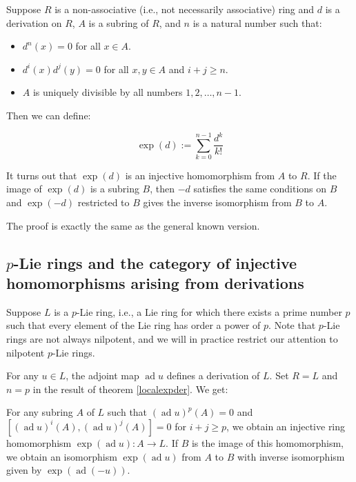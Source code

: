 \documentclass[10pt]{amsart}
\newcommand{\ad}{\operatorname{ad}}
\begin{document}
\begin{theorem}\label{localexpder}
Suppose $R$ is a non-associative (i.e., not necessarily associative)
ring and $d$ is a derivation on $R$, $A$ is a subring of $R$, and $n$
is a natural number such that:

\begin{itemize}
\item $d^n(x) = 0$ for all $x \in A$.
\item $d^i(x)d^j(y) = 0$ for all $x,y \in A$ and $i + j \ge n$.
\item $A$ is uniquely divisible by all numbers $1,2,\dots,n-1$.
\end{itemize}

Then we can define:

$$\exp(d) := \sum_{k=0}^{n-1} \frac{d^k}{k!}$$

It turns out that $\exp(d)$ is an injective homomorphism from $A$ to
$R$. If the image of $\exp(d)$ is a subring $B$, then $-d$ satisfies
the same conditions on $B$ and $\exp(-d)$ restricted to $B$ gives the
inverse isomorphism from $B$ to $A$. 
\end{theorem}

The proof is exactly the same as the general known version.

\subsection{$p$-Lie rings and the category of injective homomorphisms arising from derivations}

Suppose $L$ is a $p$-Lie ring, i.e., a Lie ring for which there exists
a prime number $p$ such that every element of the Lie ring has order a
power of $p$. Note that $p$-Lie rings are not always nilpotent, and we
will in practice restrict our attention to nilpotent $p$-Lie rings.

For any $u \in L$, the adjoint map $\ad u$ defines a derivation of
$L$. Set $R = L$ and $n = p$ in the result of theorem \ref{localexpder}. We get:

\begin{theorem}\label{innercategorysetup}
  For any subring $A$ of $L$ such that $(\ad u)^p(A) = 0$ and $[(\ad
  u)^i(A),(\ad u)^j(A)] = 0$ for $i + j \ge p$, we obtain an injective
  ring homomorphism $\exp(\ad u): A \to L$. If $B$ is the image of
  this homomorphism, we obtain an isomorphism $\exp(\ad u)$ from $A$
  to $B$ with inverse isomorphism given by $\exp(\ad (-u))$.
\end{theorem}
\end{document}
